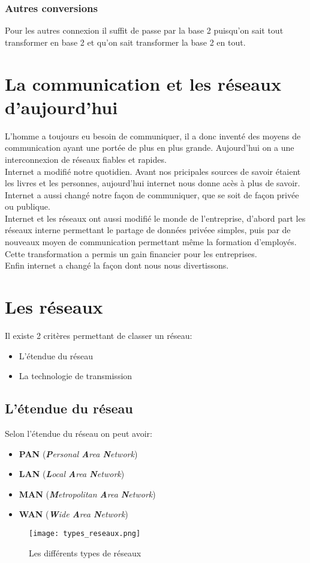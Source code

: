 \documentclass[10pt,a4paper]{article}
\begin{document}
 \subsubsection{Autres conversions}
 Pour les autres connexion il suffit de passe par la base 2 puisqu'on sait tout transformer en base 2 et qu'on sait transformer la base 2 en tout.

 \section{La communication et les réseaux d'aujourd'hui}
 L'homme a toujours eu besoin de communiquer, il a donc inventé des moyens de communication ayant une portée de plus en plus grande. Aujourd'hui on a une interconnexion de réseaux fiables et rapides.\\
 Internet a modifié notre quotidien. Avant nos pricipales sources de savoir étaient les livres et les personnes, aujourd'hui internet nous donne acès à plus de savoir.\\
 Internet a aussi changé notre façon de communiquer, que se soit de façon privée ou publique.\\
 Internet et les réseaux ont aussi modifié le monde de l'entreprise, d'abord part les réseaux interne permettant le partage de données privéee simples, puis par de nouveaux moyen de communication permettant même la formation d'employés. Cette transformation a permis un gain financier pour les entreprises.\\
 Enfin internet a changé la façon dont nous nous divertissons.

 \section{Les réseaux}
 Il existe 2 critères permettant de classer un réseau:
 \begin{itemize}
	 \item L'étendue du réseau
	 \item La technologie de transmission
 \end{itemize}
 \subsection{L'étendue du réseau}
 Selon l'étendue du réseau on peut avoir:
 \begin{itemize}
	 \item \textbf{PAN} (\textit{\textbf{P}ersonal \textbf{A}rea \textbf{N}etwork})
	 \item \textbf{LAN} (\textit{\textbf{L}ocal \textbf{A}rea \textbf{N}etwork})
	 \item \textbf{MAN} (\textit{\textbf{M}etropolitan \textbf{A}rea \textbf{N}etwork})
	 \item \textbf{WAN} (\textit{\textbf{W}ide \textbf{A}rea \textbf{N}etwork})
 \end{itemize}
 \begin{figure}
 \texttt{[image: types\_reseaux.png]}
 \caption{Les différents types de réseaux}
 \end{figure}
\end{document}
